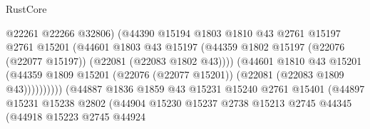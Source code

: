 \begin{lexlean}{RustCore}
\begin{coremodule}
                                            @22261
                                            @22266
                                            @32806)
                                          (@44390
                                            @15194
                                            @1803
                                            @1810
                                            @43
                                            @2761
                                            @15197
                                            @2761
                                            @15201
                                            (@44601
                                              @1803
                                              @43
                                              @15197
                                              (@44359
                                                @1802
                                                @15197
                                                (@22076 (@22077 @15197))
                                                (@22081 (@22083 @1802 @43))))
                                            (@44601
                                              @1810
                                              @43
                                              @15201
                                              (@44359
                                                @1809
                                                @15201
                                                (@22076 (@22077 @15201))
                                                (@22081 (@22083 @1809 @43))))))))))
                                (@44887
                                  @1836
                                  @1859
                                  @43
                                  @15231
                                  @15240
                                  @2761
                                  @15401
                                  (@44897
                                    @15231
                                    @15238
                                    @2802
                                    (@44904
                                      @15230
                                      @15237
                                      @2738
                                      @15213
                                      @2745
                                      @44345
                                      (@44918
                                        @15223
                                        @2745
                                        @44924

\end{coremodule}
\end{lexlean}
